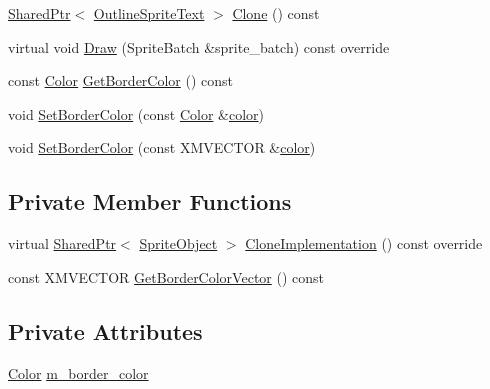 \begin{DoxyCompactItemize}
\item 
\hyperlink{namespacemage_a1e01ae66713838a7a67d30e44c67703e}{Shared\+Ptr}$<$ \hyperlink{classmage_1_1_outline_sprite_text}{Outline\+Sprite\+Text} $>$ \hyperlink{classmage_1_1_outline_sprite_text_ad3184b798d08e38d10f910a6e9dc1495}{Clone} () const
\item 
virtual void \hyperlink{classmage_1_1_outline_sprite_text_a524e9ad1caeeeaa32405e61d1a5e1032}{Draw} (Sprite\+Batch \&sprite\+\_\+batch) const override
\item 
const \hyperlink{structmage_1_1_color}{Color} \hyperlink{classmage_1_1_outline_sprite_text_a9b2c999e3775062cd07b57776f76789c}{Get\+Border\+Color} () const
\item 
void \hyperlink{classmage_1_1_outline_sprite_text_a604ddf111590ba7e4f80b2a9d2aa9ff0}{Set\+Border\+Color} (const \hyperlink{structmage_1_1_color}{Color} \&\hyperlink{namespacemage_a56eceea5a9bceb2b56073f3ea4945781}{color})
\item 
void \hyperlink{classmage_1_1_outline_sprite_text_aa2df78f6654a09af1d35f22d9a71e485}{Set\+Border\+Color} (const X\+M\+V\+E\+C\+T\+OR \&\hyperlink{namespacemage_a56eceea5a9bceb2b56073f3ea4945781}{color})
\end{DoxyCompactItemize}
\subsection*{Private Member Functions}
\begin{DoxyCompactItemize}
\item 
virtual \hyperlink{namespacemage_a1e01ae66713838a7a67d30e44c67703e}{Shared\+Ptr}$<$ \hyperlink{classmage_1_1_sprite_object}{Sprite\+Object} $>$ \hyperlink{classmage_1_1_outline_sprite_text_a90ed9cba10e082d6ce07dfa1b6189246}{Clone\+Implementation} () const override
\item 
const X\+M\+V\+E\+C\+T\+OR \hyperlink{classmage_1_1_outline_sprite_text_af4c03ed22f2e923af5f68eba5c39d9dc}{Get\+Border\+Color\+Vector} () const
\end{DoxyCompactItemize}
\subsection*{Private Attributes}
\begin{DoxyCompactItemize}
\item 
\hyperlink{structmage_1_1_color}{Color} \hyperlink{classmage_1_1_outline_sprite_text_a19301d370498a08759445f415da78822}{m\+\_\+border\+\_\+color}
\end{DoxyCompactItemize}
